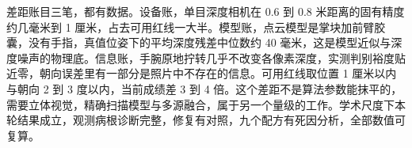 \documentclass{article}
\begin{document}
差距账目三笔，都有数据。设备账，单目深度相机在 0.6 到 0.8 米距离的固有精度约几毫米到 1 厘米，占去可用红线一大半。模型账，点云模型是掌块加前臂胶囊，没有手指，真值位姿下的平均深度残差中位数约 40 毫米，这是模型近似与深度噪声的物理底。信息账，手腕原地拧转几乎不改变各像素深度，实测判别裕度贴近零，朝向误差里有一部分是照片中不存在的信息。可用红线取位置 1 厘米以内与朝向 2 到 3 度以内，当前成绩差 3 到 4 倍。这个差距不是算法参数能抹平的，需要立体视觉，精确扫描模型与多源融合，属于另一个量级的工作。学术尺度下本轮结果成立，观测病根诊断完整，修复有对照，九个配方有死因分析，全部数值可复算。
\end{document}
